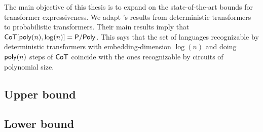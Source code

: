 The main objective of this thesis is to expand on the state-of-the-art bounds for transformer expressiveness.
We adapt \citet{toyota}'s results from deterministic transformers to probabilistic transformers.
Their main results imply that $\mathsf{CoT}[\mathsf{poly}(n), \log(n)] = \mathsf{P/Poly}$.
This says that the set of languages recognizable by deterministic transformers with  embedding-dimension $\log(n)$ and doing $\mathsf{poly}(n)$ steps of $\mathsf{CoT}$ coincide with the ones recognizable by circuits of polynomial size.


\subsection{Upper bound}



\subsection{Lower bound}

